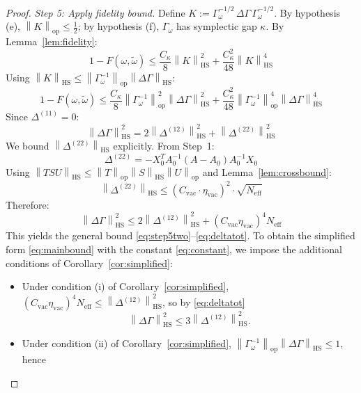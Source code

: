 \documentclass[11pt,a4paper]{article}
\theoremstyle{plain}
\theoremstyle{definition}
\theoremstyle{remark}
\newcommand{\opnorm}[1]{\left\lVert #1 \right\rVert_{\mathrm{op}}}
\newcommand{\hsnorm}[1]{\left\lVert #1 \right\rVert_{\mathrm{HS}}}
\newcommand{\etavac}{\eta_{\mathrm{vac}}}
\newcommand{\Cvac}{C_{\mathrm{vac}}}
\newcommand{\Neff}{N_{\mathrm{eff}}}
\newcommand{\Ckappa}{C_{\kappa}}
\begin{document}
\begin{proof}
\emph{Step 5: Apply fidelity bound.} Define
$K := \Gamma_\omega^{-1/2}\,\Delta\Gamma\,\Gamma_\omega^{-1/2}$. By hypothesis (e),
$\opnorm{K} \le \tfrac{1}{2}$; by hypothesis (f), $\Gamma_\omega$ has symplectic gap
$\kappa$. By Lemma~\ref{lem:fidelity}:
\begin{equation}\label{eq:step5start}
1 - F(\omega, \tilde{\omega}) \le \frac{\Ckappa}{8}\hsnorm{K}^2
+ \frac{\Ckappa^2}{48}\hsnorm{K}^4
\end{equation}
Using $\hsnorm{K} \le \opnorm{\Gamma_\omega^{-1}}\hsnorm{\Delta\Gamma}$:
\begin{equation}\label{eq:step5two}
1 - F(\omega, \tilde{\omega}) \le
\frac{\Ckappa}{8}\opnorm{\Gamma_\omega^{-1}}^2\hsnorm{\Delta\Gamma}^2
+ \frac{\Ckappa^2}{48}\opnorm{\Gamma_\omega^{-1}}^4\hsnorm{\Delta\Gamma}^4
\end{equation}
Since $\Delta^{(11)} = 0$:
\begin{equation}
\hsnorm{\Delta\Gamma}^2 = 2\hsnorm{\Delta^{(12)}}^2 + \hsnorm{\Delta^{(22)}}^2
\end{equation}
We bound $\hsnorm{\Delta^{(22)}}$ explicitly. From Step~1:
\begin{equation}
\Delta^{(22)} = -X_0^T A_0^{-1}(A - A_0)A_0^{-1} X_0
\end{equation}
Using $\hsnorm{TSU} \le \opnorm{T}\hsnorm{S}\opnorm{U}$ and
Lemma~\ref{lem:crossbound}:
\begin{equation}
\hsnorm{\Delta^{(22)}} \le (\Cvac \cdot \etavac)^2 \cdot \sqrt{\Neff}
\end{equation}
Therefore:
\begin{equation}\label{eq:deltatot}
\hsnorm{\Delta\Gamma}^2 \le 2\hsnorm{\Delta^{(12)}}^2 + (\Cvac \etavac)^4 \Neff
\end{equation}
This yields the general bound \eqref{eq:step5two}--\eqref{eq:deltatot}. To obtain
the simplified form \eqref{eq:mainbound} with the constant \eqref{eq:constant}, we
impose the additional conditions of Corollary~\ref{cor:simplified}:
\begin{itemize}
\item Under condition (i) of Corollary~\ref{cor:simplified},
$(\Cvac\etavac)^4 \Neff \le \hsnorm{\Delta^{(12)}}^2$, so by \eqref{eq:deltatot}
\begin{equation}\label{eq:three}
\hsnorm{\Delta\Gamma}^2 \le 3\hsnorm{\Delta^{(12)}}^2.
\end{equation}
\item Under condition (ii) of Corollary~\ref{cor:simplified},
$\opnorm{\Gamma_\omega^{-1}}\hsnorm{\Delta\Gamma} \le 1$, hence

\end{itemize}
\end{proof}
\end{document}
